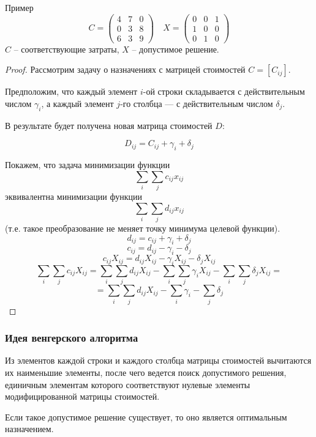 \documentclass[17pt]{extarticle}
\begin{document}
Пример
\[
    C = \begin{pmatrix}
        4 & 7 & 0 \\
        0 & 3 & 8 \\
        6 & 3 & 9
    \end{pmatrix} \quad
    X = \begin{pmatrix}
        0 & 0 & 1 \\
        1 & 0 & 0 \\
        0 & 1 & 0
    \end{pmatrix}
\]
$C$ -- соответствующие затраты, $X$ -- допустимое решение.

\begin{proof}
    Рассмотрим задачу о назначениях с матрицей стоимостей \( C = [C_{ij}] \).

    Предположим, что каждый элемент \( i \)-ой строки складывается с действительным числом \( \gamma_i \), а каждый элемент \( j \)-го столбца — с действительным числом \( \delta_j \).

    В результате будет получена новая матрица стоимостей \( D \):

    \[
        D_{ij} = C_{ij} + \gamma_i + \delta_j
    \]

    Покажем, что задача минимизации функции
    \[
        \sum_i \sum_j c_{ij} x_{ij}
    \]
    эквивалентна минимизации функции
    \[
        \sum_i \sum_j d_{ij} x_{ij}
    \]
    (т.е. такое преобразование не меняет точку минимума целевой функции).
    \[
        d_{ij} = c_{ij} + \gamma_i + \delta_j
    \]
    \[
        c_{ij} = d_{ij} - \gamma_i - \delta_j
    \]
    \[
        c_{ij}X_{ij} = d_{ij}X_{ij} - \gamma_i X_{ij} - \delta_j X_{ij}
    \]
    \[
        \sum_i \sum_j c_{ij}X_{ij} = \sum_i \sum_j d_{ij}X_{ij} - \sum_i \sum_j \gamma_i X_{ij} - \sum_i \sum_j \delta_j X_{ij} =
    \]
    \[
        = \sum_i \sum_j d_{ij}X_{ij} - \sum_i \gamma_i - \sum_j \delta_j
    \]
\end{proof}

\subsubsection{Идея венгерского алгоритма}

Из элементов каждой строки и каждого столбца матрицы
стоимостей вычитаются их наименьшие элементы, после чего
ведется поиск допустимого решения, единичным элементам
которого соответствуют нулевые элементы
модифицированной матрицы стоимостей.

Если такое допустимое решение существует, то оно является
оптимальным назначением.
\end{document}
